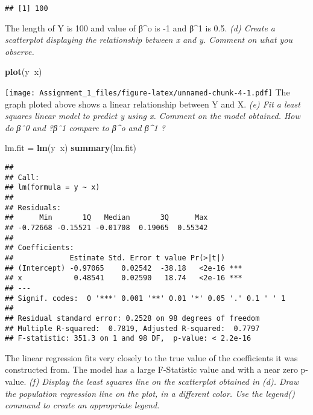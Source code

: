 \documentclass[]{article}
\newenvironment{Shaded}{\begin{snugshade}}{\end{snugshade}}
\newcommand{\KeywordTok}[1]{\textcolor[rgb]{0.13,0.29,0.53}{\textbf{#1}}}
\newcommand{\StringTok}[1]{\textcolor[rgb]{0.31,0.60,0.02}{#1}}
\newcommand{\OperatorTok}[1]{\textcolor[rgb]{0.81,0.36,0.00}{\textbf{#1}}}
\newcommand{\NormalTok}[1]{#1}
\begin{document}
\begin{verbatim}
## [1] 100
\end{verbatim}

The length of Y is 100 and value of β\^{}o is -1 and β\^{}1 is 0.5.
\emph{(d) Create a scatterplot displaying the relationship between x and
y. Comment on what you observe.}

\begin{Shaded}
\begin{Highlighting}[]
\KeywordTok{plot}\NormalTok{(y}\OperatorTok{~}\NormalTok{x)}
\end{Highlighting}
\end{Shaded}

\texttt{[image: Assignment\_1\_files/figure-latex/unnamed-chunk-4-1.pdf]}
The graph ploted above shows a linear relationship between Y and X.
\emph{(e) Fit a least squares linear model to predict y using x. Comment
on the model obtained. How do βˆ0 and ?βˆ1 compare to β\^{}o and β\^{}1
?}

\begin{Shaded}
\begin{Highlighting}[]
\NormalTok{lm.fit =}\StringTok{ }\KeywordTok{lm}\NormalTok{(y}\OperatorTok{~}\NormalTok{x)}
\KeywordTok{summary}\NormalTok{(lm.fit)}
\end{Highlighting}
\end{Shaded}

\begin{verbatim}
## 
## Call:
## lm(formula = y ~ x)
## 
## Residuals:
##      Min       1Q   Median       3Q      Max 
## -0.72668 -0.15521 -0.01708  0.19065  0.55342 
## 
## Coefficients:
##             Estimate Std. Error t value Pr(>|t|)    
## (Intercept) -0.97065    0.02542  -38.18   <2e-16 ***
## x            0.48541    0.02590   18.74   <2e-16 ***
## ---
## Signif. codes:  0 '***' 0.001 '**' 0.01 '*' 0.05 '.' 0.1 ' ' 1
## 
## Residual standard error: 0.2528 on 98 degrees of freedom
## Multiple R-squared:  0.7819, Adjusted R-squared:  0.7797 
## F-statistic: 351.3 on 1 and 98 DF,  p-value: < 2.2e-16
\end{verbatim}

The linear regression fits very closely to the true value of the
coefficients it was constructed from. The model has a large F-Statistic
value and with a near zero p-value. \emph{(f) Display the least squares
line on the scatterplot obtained in (d). Draw the population regression
line on the plot, in a different color. Use the legend() command to
create an appropriate legend.}
\end{document}
